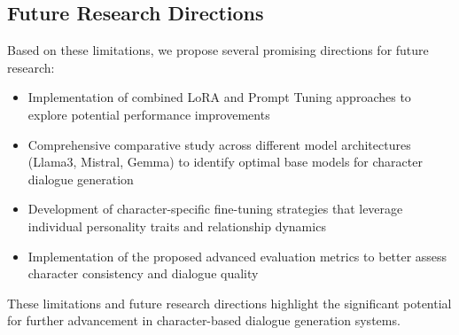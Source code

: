 \documentclass{article}
\begin{document}
\subsection{Future Research Directions}

Based on these limitations, we propose several promising directions for future research:

\begin{itemize}
\item Implementation of combined LoRA and Prompt Tuning approaches to explore potential performance improvements
\item Comprehensive comparative study across different model architectures (Llama3, Mistral, Gemma) to identify optimal base models for character dialogue generation
\item Development of character-specific fine-tuning strategies that leverage individual personality traits and relationship dynamics
\item Implementation of the proposed advanced evaluation metrics to better assess character consistency and dialogue quality
\end{itemize}

These limitations and future research directions highlight the significant potential for further advancement in character-based dialogue generation systems.






\clearpage
\end{document}
